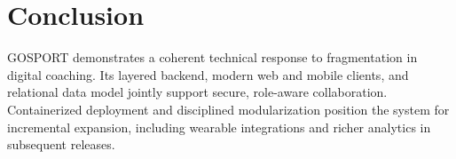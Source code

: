\documentclass[11pt,a4paper]{report}
\begin{document}
\chapter{Conclusion}

GOSPORT demonstrates a coherent technical response to fragmentation in digital coaching. Its layered backend, modern web and mobile clients, and relational data model jointly support secure, role-aware collaboration. Containerized deployment and disciplined modularization position the system for incremental expansion, including wearable integrations and richer analytics in subsequent releases.
\end{document}

